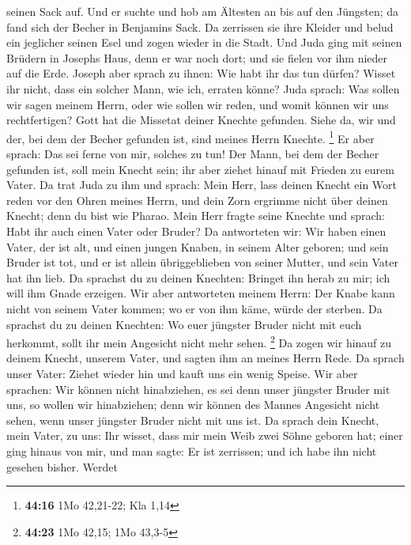 seinen Sack auf.  Und er suchte und hob am Ältesten an
bis auf den Jüngsten; da fand sich der Becher in Benjamins Sack.
 Da zerrissen sie ihre Kleider und belud ein jeglicher
seinen Esel und zogen wieder in die Stadt.  Und Juda ging
mit seinen Brüdern in Josephs Haus, denn er war noch dort; und sie
fielen vor ihm nieder auf die Erde.  Joseph aber sprach
zu ihnen: Wie habt ihr das tun dürfen? Wisset ihr nicht, dass ein
solcher Mann, wie ich, erraten könne?  Juda sprach: Was
sollen wir sagen meinem Herrn, oder wie sollen wir reden, und womit
können wir uns rechtfertigen? Gott hat die Missetat deiner Knechte
gefunden. Siehe da, wir und der, bei dem der Becher gefunden ist, sind
meines Herrn Knechte. \footnote{\textbf{44:16} 1Mo 42,21-22; Kla 1,14}
 Er aber sprach: Das sei ferne von mir, solches zu tun!
Der Mann, bei dem der Becher gefunden ist, soll mein Knecht sein; ihr
aber ziehet hinauf mit Frieden zu eurem Vater.  Da trat
Juda zu ihm und sprach: Mein Herr, lass deinen Knecht ein Wort reden vor
den Ohren meines Herrn, und dein Zorn ergrimme nicht über deinen Knecht;
denn du bist wie Pharao.  Mein Herr fragte seine Knechte
und sprach: Habt ihr auch einen Vater oder Bruder?  Da
antworteten wir: Wir haben einen Vater, der ist alt, und einen jungen
Knaben, in seinem Alter geboren; und sein Bruder ist tot, und er ist
allein übriggeblieben von seiner Mutter, und sein Vater hat ihn lieb.
 Da sprachst du zu deinen Knechten: Bringet ihn herab zu
mir; ich will ihm Gnade erzeigen.  Wir aber antworteten
meinem Herrn: Der Knabe kann nicht von seinem Vater kommen; wo er von
ihm käme, würde der sterben.  Da sprachst du zu deinen
Knechten: Wo euer jüngster Bruder nicht mit euch herkommt, sollt ihr
mein Angesicht nicht mehr sehen. \footnote{\textbf{44:23} 1Mo 42,15; 1Mo
  43,3-5}  Da zogen wir hinauf zu deinem Knecht, unserem
Vater, und sagten ihm an meines Herrn Rede.  Da sprach
unser Vater: Ziehet wieder hin und kauft uns ein wenig Speise.
 Wir aber sprachen: Wir können nicht hinabziehen, es sei
denn unser jüngster Bruder mit uns, so wollen wir hinabziehen; denn wir
können des Mannes Angesicht nicht sehen, wenn unser jüngster Bruder
nicht mit uns ist.  Da sprach dein Knecht, mein Vater, zu
uns: Ihr wisset, dass mir mein Weib zwei Söhne geboren hat;
 einer ging hinaus von mir, und man sagte: Er ist
zerrissen; und ich habe ihn nicht gesehen bisher.  Werdet
